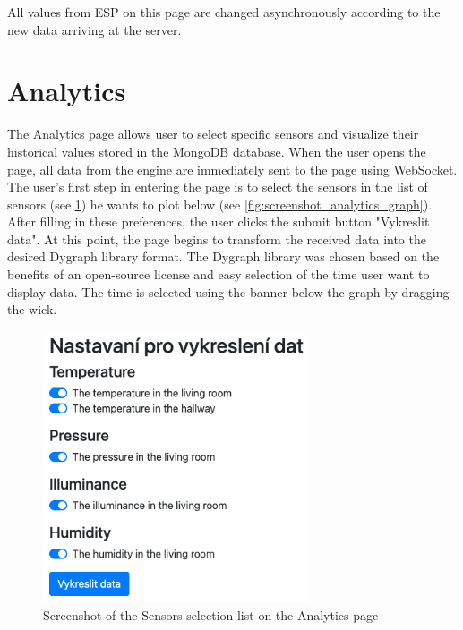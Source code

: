 All values from ESP on this page are changed asynchronously according to the new data arriving at the server.

\section{Analytics}

The Analytics page allows user to select specific sensors and visualize their historical values stored in the MongoDB database. When the user opens the page, all data from the engine are immediately sent to the page using WebSocket. The user's first step in entering the page is to select the sensors in the list of sensors (see \cref{fig:screenshot_analytics_filter}) he wants to plot below (see \cref{fig:screenshot_analytics_graph}). After filling in these preferences, the user clicks the submit button "Vykreslit data". At this point, the page begins to transform the received data into the desired Dygraph library format. The Dygraph library was chosen based on the benefits of an open-source license and easy selection of the time user want to display data. The time is selected using the banner below the graph by dragging the wick.

\begin{figure}[H]
    \centering
    \includegraphics[width=0.7\textwidth]{img/screenshot_analytics_filter.png}
    \caption{Screenshot of the Sensors selection list on the Analytics page}
    \label{fig:screenshot_analytics_filter}
\end{figure}

